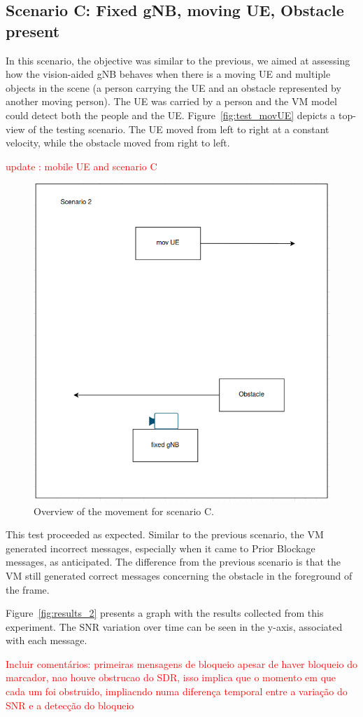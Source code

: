 \subsection{Scenario C: Fixed gNB, moving UE, Obstacle present}\label{subsec:scenario-0.1:-fixed-gnb-moving-ue-obstacle-present}

In this scenario, the objective was similar to the previous, we aimed at assessing how the vision-aided gNB behaves when there is a moving UE and multiple objects in the scene (a person carrying the UE and an obstacle represented by another moving person)\@.
The UE was carried by a person and the VM model could detect both the people and the UE\@.
Figure~\ref{fig:test_movUE} depicts a top-view of the testing scenario.
The UE moved from left to right at a constant velocity, while the obstacle moved from right to left.

\textcolor{red}{update : mobile UE and scenario C}
\begin{figure}[H]
    \centering
    \includegraphics[width=0.5\linewidth]{figures/scenario2}
    \caption{Overview of the movement for scenario C.}
    \label{fig:test_movUE_obst}
\end{figure}

This test proceeded as expected.
Similar to the previous scenario, the VM generated incorrect messages, especially when it came to Prior Blockage messages, as anticipated.
The difference from the previous scenario is that the VM still generated correct messages concerning the obstacle in the foreground of the frame.


Figure~\ref{fig:results_2} presents a graph with the results collected from this experiment.
The SNR variation over time can be seen in the y-axis, associated with each message.

\textcolor{red}{Incluir comentários: primeiras mensagens de bloqueio apesar de haver bloqueio do marcador, nao houve obstrucao do SDR, isso implica que o momento em que cada um foi obstruido, impliacndo numa diferença temporal entre a variação do SNR e a detecção do bloqueio}


